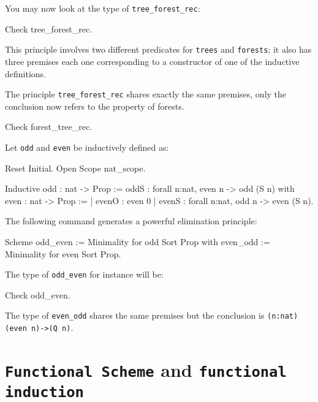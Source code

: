 \begin{coq_example*}
You may now look at the type of {\tt tree\_forest\_rec}:

\begin{coq_example}
Check tree_forest_rec.
\end{coq_example}

This principle involves two different predicates for {\tt trees} and
{\tt forests}; it also has three premises each one corresponding to a
constructor of one of the inductive definitions.

The principle {\tt tree\_forest\_rec} shares exactly the same
premises, only the conclusion now refers to the property of forests.

\begin{coq_example}
Check forest_tree_rec.
\end{coq_example}


Let {\tt odd} and {\tt even} be inductively defined as:

\begin{coq_eval}
Reset Initial.
Open Scope nat_scope.
\end{coq_eval}

\begin{coq_example*}
Inductive odd : nat -> Prop :=
    oddS : forall n:nat, even n -> odd (S n)
with even : nat -> Prop :=
  | evenO : even 0
  | evenS : forall n:nat, odd n -> even (S n).
\end{coq_example*}

The following command generates a powerful elimination
principle:

\begin{coq_example}
Scheme odd_even := Minimality for   odd Sort Prop
  with even_odd := Minimality for even Sort Prop.
\end{coq_example}

The type of {\tt odd\_even} for instance will be:

\begin{coq_example}
Check odd_even.
\end{coq_example}

The type of {\tt even\_odd} shares the same premises but the
conclusion is {\tt (n:nat)(even n)->(Q n)}.

\section{{\tt Functional Scheme} and {\tt functional induction}}
\label{FunScheme-examples}


\end{coq_example*}
